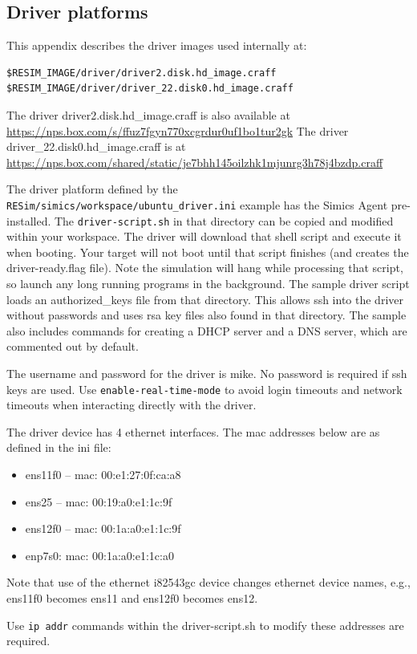 \documentclass[titlepage]{article}
\begin{document}
\begin{appendices}
\section{Driver platforms}
\label{driver}
This appendix describes the driver images used internally at:
\begin{verbatim}
$RESIM_IMAGE/driver/driver2.disk.hd_image.craff
$RESIM_IMAGE/driver/driver_22.disk0.hd_image.craff
\end{verbatim}
The driver driver2.disk.hd\_image.craff is also available at \url{https://nps.box.com/s/ffuz7fgyn770xcgrdur0uf1bo1tur2gk}
The driver driver\_22.disk0.hd\_image.craff is at  \url{https://nps.box.com/shared/static/je7bhh145oilzhk1mjunrg3h78j4bzdp.craff}

The driver platform defined by the {\tt RESim/simics/workspace/ubuntu\_driver.ini} example has the Simics Agent pre-installed.  The
{\tt driver-script.sh} in that directory can be copied and modified within your workspace.  The driver will download that shell script and execute
it when booting.  Your target will not boot until that script finishes (and creates the driver-ready.flag file).
Note the simulation will hang while processing that script, so launch any long running programs in the background.
The sample driver script loads an authorized\_keys file from that directory.  This allows ssh into the driver without passwords and uses
rsa key files also found in that directory.  The sample also includes commands for creating a DHCP server and a DNS server, which are commented out by default.

The username and password for the driver is mike. No password is required if ssh keys are used.  Use {\tt enable-real-time-mode} to avoid login timeouts and network timeouts when
interacting directly with the driver.  

The driver device has 4 ethernet interfaces.  The mac addresses below are as defined in the ini file:
\begin{itemize}
\item ens11f0 -- mac: 00:e1:27:0f:ca:a8
\item ens25 -- mac: 00:19:a0:e1:1c:9f
\item ens12f0 -- mac: 00:1a:a0:e1:1c:9f
\item enp7s0:  mac: 00:1a:a0:e1:1c:a0 
\end{itemize}
Note that use of the ethernet i82543gc device changes ethernet device names, e.g., ens11f0 becomes ens11 and ens12f0 becomes ens12.

Use {\tt ip addr} commands within the driver-script.sh to modify these addresses are required.


\end{appendices}
\end{document}

